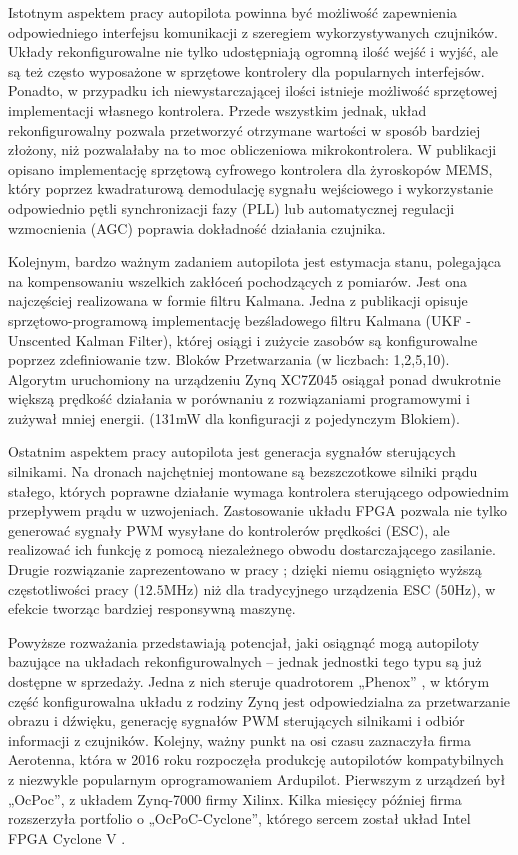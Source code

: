 Istotnym aspektem pracy autopilota powinna być możliwość zapewnienia odpowiedniego interfejsu komunikacji z szeregiem wykorzystywanych czujników. Układy rekonfigurowalne nie tylko udostępniają ogromną ilość wejść i wyjść, ale są też często wyposażone w sprzętowe kontrolery dla popularnych interfejsów. Ponadto, w przypadku ich niewystarczającej ilości istnieje możliwość sprzętowej implementacji własnego kontrolera. Przede wszystkim jednak, układ rekonfigurowalny pozwala przetworzyć otrzymane wartości w sposób bardziej złożony, niż pozwalałaby na to moc obliczeniowa mikrokontrolera. W publikacji \cite{MEMS} opisano implementację sprzętową cyfrowego kontrolera dla żyroskopów MEMS, który poprzez kwadraturową demodulację sygnału wejściowego i wykorzystanie odpowiednio pętli synchronizacji fazy (PLL) lub automatycznej regulacji wzmocnienia (AGC) poprawia dokładność działania czujnika.

Kolejnym, bardzo ważnym zadaniem autopilota jest estymacja stanu, polegająca na kompensowaniu wszelkich zakłóceń pochodzących z pomiarów. Jest ona najczęściej realizowana w formie filtru Kalmana. Jedna z publikacji \cite{SohKalman} opisuje sprzętowo-programową implementację bezśladowego filtru Kalmana (UKF - Unscented Kalman Filter), której osiągi i zużycie zasobów są konfigurowalne poprzez zdefiniowanie tzw. Bloków Przetwarzania (w liczbach: 1,2,5,10). Algorytm uruchomiony na urządzeniu Zynq XC7Z045 osiągał ponad dwukrotnie większą prędkość działania w porównaniu z rozwiązaniami programowymi i zużywał mniej energii. (131mW dla konfiguracji z pojedynczym Blokiem). 

Ostatnim aspektem pracy autopilota jest generacja sygnałów sterujących silnikami. Na dronach najchętniej montowane są bezszczotkowe silniki prądu stałego, których poprawne działanie wymaga kontrolera sterującego odpowiednim przepływem prądu w uzwojeniach. Zastosowanie układu FPGA pozwala nie tylko generować sygnały PWM wysyłane do kontrolerów prędkości (ESC), ale realizować ich funkcję z pomocą niezależnego obwodu dostarczającego zasilanie. Drugie rozwiązanie zaprezentowano w pracy \cite{ESC}; dzięki niemu osiągnięto wyższą częstotliwości pracy ($12.5$MHz) niż dla tradycyjnego urządzenia ESC ($50$Hz), w efekcie tworząc bardziej responsywną maszynę.

Powyższe rozważania przedstawiają potencjał, jaki osiągnąć mogą autopiloty bazujące na układach rekonfigurowalnych -- jednak jednostki tego typu są już dostępne w sprzedaży. Jedna z nich steruje quadrotorem „Phenox” \cite{Konomura}, w którym część konfigurowalna układu z rodziny Zynq jest odpowiedzialna za przetwarzanie obrazu i dźwięku, generację sygnałów PWM sterujących silnikami i odbiór informacji z czujników.
Kolejny, ważny punkt na osi czasu zaznaczyła firma Aerotenna, która w 2016 roku rozpoczęła produkcję autopilotów kompatybilnych z niezwykle popularnym oprogramowaniem Ardupilot. Pierwszym z urządzeń był „OcPoc”, z układem Zynq-7000 firmy Xilinx. Kilka miesięcy później firma rozszerzyła portfolio o „OcPoC-Cyclone”, którego sercem został układ Intel FPGA Cyclone V \cite{Aerotenna}.

